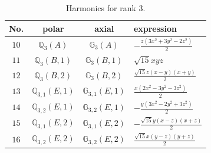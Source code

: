 \documentclass[fleqn,8pt,landscape]{jsarticle}
\begin{document}
\begin{table}[ht!]
\begin{center}
\caption{Harmonics for rank 3.}
\renewcommand{\arraystretch}{1.3}
\begin{tabular}{cccl} \hline \hline
No. & polar & axial & expression \\ \hline
$ 10 $ & $ \mathbb{Q}_{3}(A) $ & $ \mathbb{G}_{3}(A) $ & $ - \frac{z \left(3 x^{2} + 3 y^{2} - 2 z^{2}\right)}{2} $ \\
$ 11 $ & $ \mathbb{Q}_{3}(B,1) $ & $ \mathbb{G}_{3}(B,1) $ & $ \sqrt{15} x y z $ \\
$ 12 $ & $ \mathbb{Q}_{3}(B,2) $ & $ \mathbb{G}_{3}(B,2) $ & $ \frac{\sqrt{15} z \left(x - y\right) \left(x + y\right)}{2} $ \\
$ 13 $ & $ \mathbb{Q}_{3,1}(E,1) $ & $ \mathbb{G}_{3,1}(E,1) $ & $ \frac{x \left(2 x^{2} - 3 y^{2} - 3 z^{2}\right)}{2} $ \\
$ 14 $ & $ \mathbb{Q}_{3,2}(E,1) $ & $ \mathbb{G}_{3,2}(E,1) $ & $ - \frac{y \left(3 x^{2} - 2 y^{2} + 3 z^{2}\right)}{2} $ \\
$ 15 $ & $ \mathbb{Q}_{3,1}(E,2) $ & $ \mathbb{G}_{3,1}(E,2) $ & $ - \frac{\sqrt{15} y \left(x - z\right) \left(x + z\right)}{2} $ \\
$ 16 $ & $ \mathbb{Q}_{3,2}(E,2) $ & $ \mathbb{G}_{3,2}(E,2) $ & $ \frac{\sqrt{15} x \left(y - z\right) \left(y + z\right)}{2} $ \\
 \hline \hline
\end{tabular}
\end{center}
\end{table}
\end{document}
